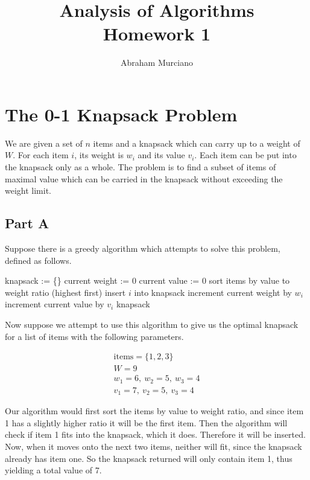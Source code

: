 \documentclass{article}
\title{Analysis of Algorithms \\
\medskip
\large Homework 1}
\author{Abraham Murciano}
\begin{document}
\maketitle

\section{The 0-1 Knapsack Problem}

We are given a set of \(n\) items and a knapsack which can carry up to a weight of \(W\). For each item \(i\), its weight is \(w_i\) and its value \(v_i\). Each item can be put into the knapsack only as a whole. The problem is to find a subset of items of maximal value which can be carried in the knapsack without exceeding the weight limit.

\subsection*{Part A}

Suppose there is a greedy algorithm which attempts to solve this problem, defined as follows.

\begin{algorithm}
	\begin{algorithmic}
		\State knapsack := \{\}
		\State current weight := 0
		\State current value := 0
		\State sort items by value to weight ratio (highest first)
		\State insert \(i\) into knapsack
		\State increment current weight by \(w_i\)
		\State increment current value by \(v_i\)
		\EndIf
		\EndFor
		\Return knapsack
		\EndFunction
	\end{algorithmic}
\end{algorithm}

Now suppose we attempt to use this algorithm to give us the optimal knapsack for a list of items with the following parameters.

\begin{gather*}
	\text{items} = \{1, 2, 3\}\\
	W = 9\\
	w_1 = 6,\ w_2 = 5,\ w_3 = 4\\
	v_1 = 7,\ v_2 = 5,\ v_3 = 4
\end{gather*}

Our algorithm would first sort the items by value to weight ratio, and since item 1 has a slightly higher ratio it will be the first item. Then the algorithm will check if item 1 fits into the knapsack, which it does. Therefore it will be inserted. Now, when it moves onto the next two items, neither will fit, since the knapsack already has item one. So the knapsack returned will only contain item 1, thus yielding a total value of 7.
\end{document}
